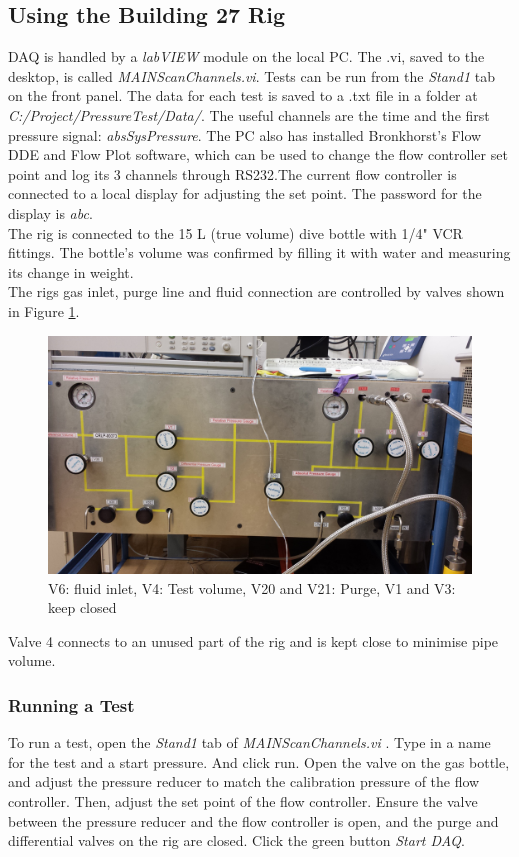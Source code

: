 \documentclass{report}
\begin{document}
\subsection{Using the Building 27 Rig}
DAQ is handled by a \textit{labVIEW} module on the local PC. The .vi, saved to the desktop, is called \textit{MAIN\textunderscore ScanChannels.vi}. Tests can be run from the \textit{Stand1} tab on the front panel. The data for each test is saved to a .txt file in a folder at \textit{C:/Project/PressureTest/Data/}. The useful channels are the time and the first pressure signal: \textit{absSysPressure}. The PC also has installed Bronkhorst's Flow DDE and Flow Plot software, which can be used to change the flow controller set point and log its 3 channels through RS232.The current flow controller is connected to a local display for adjusting the set point. The password for the display is \textit{abc}. \\
The rig is connected to the 15 L (true volume) dive bottle with 1/4" VCR fittings. The bottle's volume was confirmed by filling it with water and measuring its change in weight. \\
The rigs gas inlet, purge line and fluid connection are controlled by valves shown in Figure \ref{valves}.

\begin{figure}[h] 
\includegraphics[width=\textwidth]{valves}
\caption{V6: fluid inlet, V4: Test volume, V20 and V21: Purge, V1 and V3: keep closed}
\label{valves}
\end{figure}

Valve 4 connects to an unused part of the rig and is kept close to minimise pipe volume.\\
\subsubsection{Running a Test}
To run a test, open the \textit{Stand1} tab of \textit{MAIN\textunderscore ScanChannels.vi} . Type in a name for the test and a start pressure. And click run. Open the valve on the gas bottle, and adjust the pressure reducer to match the calibration pressure of the flow controller. Then, adjust the set point of the flow controller. Ensure the valve between the pressure reducer and the flow controller is open, and the purge and differential valves on the rig are closed. Click the green button \textit{Start DAQ}.
\end{document}
